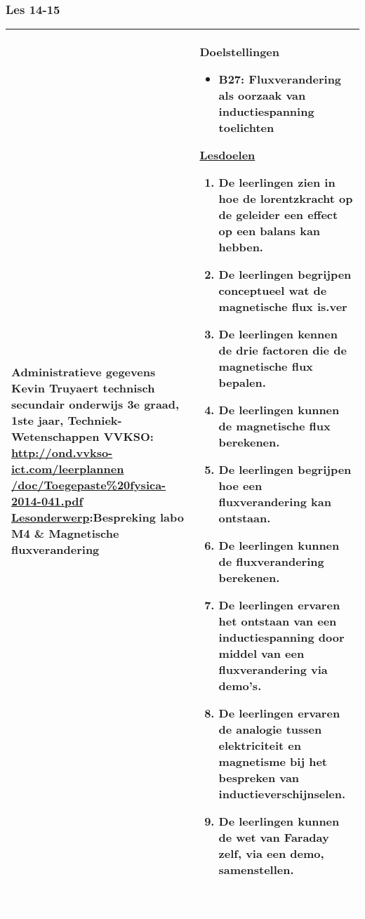 


\begin{landscape}
	\subsubsection{Les 14-15}
	\begin{tabularx}{1.56\textwidth}{|p{}|X|}\hline
		\textbf{Administratieve gegevens}\newline\newline
		Kevin Truyaert\newline\newline
		technisch secundair onderwijs\newline
		3e graad, 1ste jaar, Techniek-Wetenschappen\newline
		VVKSO: \href{http://ond.vvkso-ict.com/leerplannen/doc/Toegepaste\%20fysica-2014-041.pdf}{http://ond.vvkso-ict.com/leerplannen /doc/Toegepaste\%20fysica-2014-041.pdf} \newline
		\underline{Lesonderwerp}:\newline Bespreking labo M4 \& Magnetische fluxverandering & \textbf{Doelstellingen}
		\begin{itemize}[itemsep=0.08\baselineskip]
			\item B27: Fluxverandering als oorzaak van inductiespanning toelichten
		\end{itemize}
		\underline{Lesdoelen}\newline
		\vspace{-0.75cm}
		\begin{enumerate}[itemsep=0.08\baselineskip]
			\item De leerlingen zien in hoe de lorentzkracht op de geleider een effect op een balans kan hebben.
			\item De leerlingen begrijpen conceptueel wat de magnetische flux is.ver
			\item De leerlingen kennen de drie factoren die de magnetische flux bepalen.
			\item De leerlingen kunnen de magnetische flux berekenen.
			\item De leerlingen begrijpen hoe een fluxverandering kan ontstaan.
			\item De leerlingen kunnen de fluxverandering berekenen.
			\item De leerlingen ervaren het ontstaan van een inductiespanning door middel van een fluxverandering via demo's.
			\item De leerlingen ervaren de analogie tussen elektriciteit en magnetisme bij het bespreken van inductieverschijnselen.
			\item De leerlingen kunnen de wet van Faraday zelf, via een demo, samenstellen.
		\end{enumerate} \\\hline
	\end{tabularx}\vfill \textcolor{white}{.} 



\end{landscape}
